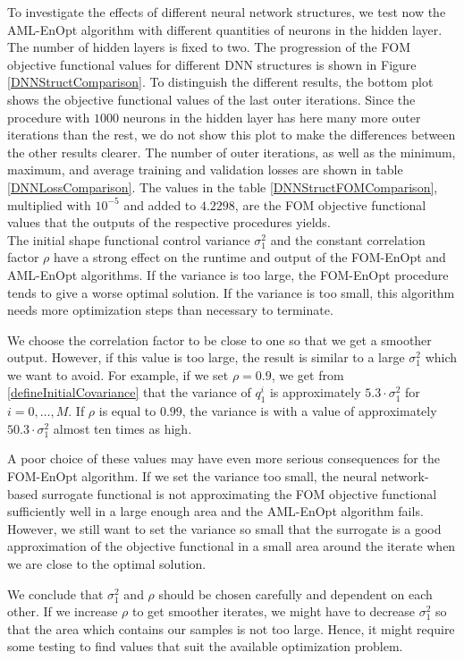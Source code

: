 To investigate the effects of different neural network structures, we test now the AML-EnOpt algorithm with different quantities of neurons in the hidden layer. The number of hidden layers is fixed to two. The progression of the FOM objective functional values for different DNN structures is shown in Figure \ref{DNNStructComparison}. To distinguish the different results, the bottom plot shows the objective functional values of the last outer iterations. Since the procedure with $1000$ neurons in the hidden layer has here many more outer iterations than the rest, we do not show this plot to make the differences between the other results clearer. The number of outer iterations, as well as the minimum, maximum, and average training and validation losses are shown in table \ref{DNNLossComparison}. The values in the table \ref{DNNStructFOMComparison}, multiplied with $10^{-5}$ and added to $4.2298$, are the FOM objective functional values that the outputs of the respective procedures yields.\\

The initial shape functional control variance $\sigma^2_1$ and the constant correlation factor $\rho$ have a strong effect on the runtime and output of the FOM-EnOpt and AML-EnOpt algorithms. If the variance is too large, the FOM-EnOpt procedure tends to give a worse optimal solution. If the variance is too small, this algorithm needs more optimization steps than necessary to terminate.

We choose the correlation factor to be close to one so that we get a smoother output. However, if this value is too large, the result is similar to a large $\sigma^2_1$ which we want to avoid. For example, if we set $\rho=0.9$, we get from \eqref{defineInitialCovariance} that the variance of $q^i_1$ is approximately $5.3\cdot\sigma^2_1$ for $i=0,\dotsc,M$. If $\rho$ is equal to $0.99$, the variance is with a value of approximately $50.3\cdot\sigma^2_1$ almost ten times as high.

A poor choice of these values may have even more serious consequences for the FOM-EnOpt algorithm. If we set the variance too small, the neural network-based surrogate functional is not approximating the FOM objective functional sufficiently well in a large enough area and the AML-EnOpt algorithm fails. However, we still want to set the variance so small that the surrogate is a good approximation of the objective functional in a small area around the iterate when we are close to the optimal solution.

We conclude that $\sigma^2_1$ and $\rho$ should be chosen carefully and dependent on each other. If we increase $\rho$ to get smoother iterates, we might have to decrease $\sigma^2_1$ so that the area which contains our samples is not too large. Hence, it might require some testing to find values that suit the available optimization problem.\\

